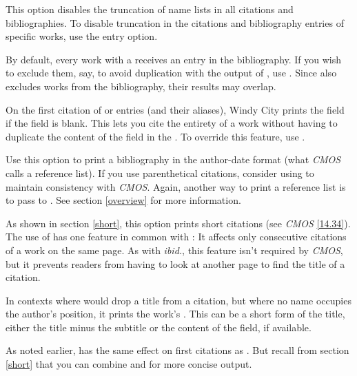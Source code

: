 \documentclass[11pt,letterpaper,oneside]{article}
\begin{document}
\begin{optionlist}
\noindent This option disables the truncation of name lists in all
citations and bibliographies. To disable truncation in the citations
and bibliography entries of specific works, use the  entry
option.


\noindent By default, every work with a  receives
an entry in the bibliography. If you wish to exclude them, say, to
avoid duplication with the output of , use
. Since  also excludes works from the
bibliography, their results may overlap.


\noindent On the first citation of  or
 entries (and their aliases), Windy City prints the
 field if the  field is blank. This
lets you cite the entirety of a work without having to duplicate the
content of the  field in the . To
override this feature, use .


\noindent Use this option to print a bibliography in the author-date
format (what \textit{CMOS} calls a reference list). If you use
parenthetical citations, consider using  to maintain
consistency with \textit{CMOS}. Again, another way to print a
reference list is to pass  to
. See section \ref{overview} for more
information.


\noindent As shown in section \ref{short}, this option prints short
citations (see \textit{CMOS} \ref{14.34}). The use of  has
one feature in common with : It affects only consecutive
citations of a work on the same page. As with \textit{ibid.}, this
feature isn't required by \textit{CMOS}, but it prevents readers from
having to look at another page to find the title of a citation.

In contexts where  would drop a title from a citation, but
where no name occupies the author's position, it prints the work's
. This can be a short form of the title, either
the title minus the subtitle or the content of the
 field, if available.

As noted earlier,  has the same effect on first citations
as . But recall from section \ref{short} that you can
combine  and  for more concise output.


\end{optionlist}
\end{document}
